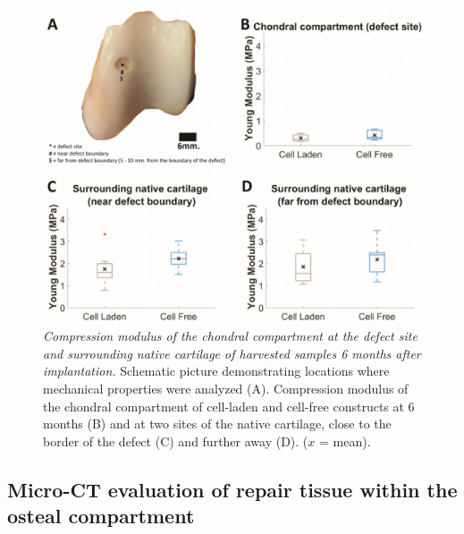\documentclass[twocolumn, serif, empirical, authordate, seplic]{jote-article}
\begin{document}
\begin{figure}
\centering \includegraphics[width=\columnwidth]{articles/empirical/horse/media/image9.jpg}
\caption{\emph{Compression modulus of the chondral compartment at the defect site and surrounding native cartilage of harvested samples 6 months after implantation.} Schematic picture demonstrating locations where mechanical properties were analyzed (A). Compression modulus of the chondral compartment of cell-laden and cell-free constructs at 6 months (B) and at two sites of the native cartilage, close to the border of the defect (C) and further away (D). ($x$ = mean).}
\label{fig:figure9}\end{figure}

 {}\subsection*{Micro-CT evaluation of repair tissue within the osteal compartment} 
\end{document}
